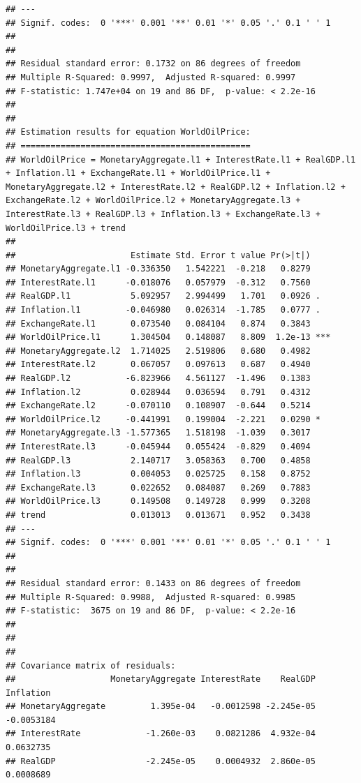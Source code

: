 \documentclass[11pt,preprint, authoryear]{elsarticle}
\numberwithin{equation}{section}
\numberwithin{figure}{section}
\numberwithin{table}{section}
\begin{document}
\begin{verbatim}
## ---
## Signif. codes:  0 '***' 0.001 '**' 0.01 '*' 0.05 '.' 0.1 ' ' 1
## 
## 
## Residual standard error: 0.1732 on 86 degrees of freedom
## Multiple R-Squared: 0.9997,  Adjusted R-squared: 0.9997 
## F-statistic: 1.747e+04 on 19 and 86 DF,  p-value: < 2.2e-16 
## 
## 
## Estimation results for equation WorldOilPrice: 
## ============================================== 
## WorldOilPrice = MonetaryAggregate.l1 + InterestRate.l1 + RealGDP.l1 + Inflation.l1 + ExchangeRate.l1 + WorldOilPrice.l1 + MonetaryAggregate.l2 + InterestRate.l2 + RealGDP.l2 + Inflation.l2 + ExchangeRate.l2 + WorldOilPrice.l2 + MonetaryAggregate.l3 + InterestRate.l3 + RealGDP.l3 + Inflation.l3 + ExchangeRate.l3 + WorldOilPrice.l3 + trend 
## 
##                       Estimate Std. Error t value Pr(>|t|)    
## MonetaryAggregate.l1 -0.336350   1.542221  -0.218   0.8279    
## InterestRate.l1      -0.018076   0.057979  -0.312   0.7560    
## RealGDP.l1            5.092957   2.994499   1.701   0.0926 .  
## Inflation.l1         -0.046980   0.026314  -1.785   0.0777 .  
## ExchangeRate.l1       0.073540   0.084104   0.874   0.3843    
## WorldOilPrice.l1      1.304504   0.148087   8.809  1.2e-13 ***
## MonetaryAggregate.l2  1.714025   2.519806   0.680   0.4982    
## InterestRate.l2       0.067057   0.097613   0.687   0.4940    
## RealGDP.l2           -6.823966   4.561127  -1.496   0.1383    
## Inflation.l2          0.028944   0.036594   0.791   0.4312    
## ExchangeRate.l2      -0.070110   0.108907  -0.644   0.5214    
## WorldOilPrice.l2     -0.441991   0.199004  -2.221   0.0290 *  
## MonetaryAggregate.l3 -1.577365   1.518198  -1.039   0.3017    
## InterestRate.l3      -0.045944   0.055424  -0.829   0.4094    
## RealGDP.l3            2.140717   3.058363   0.700   0.4858    
## Inflation.l3          0.004053   0.025725   0.158   0.8752    
## ExchangeRate.l3       0.022652   0.084087   0.269   0.7883    
## WorldOilPrice.l3      0.149508   0.149728   0.999   0.3208    
## trend                 0.013013   0.013671   0.952   0.3438    
## ---
## Signif. codes:  0 '***' 0.001 '**' 0.01 '*' 0.05 '.' 0.1 ' ' 1
## 
## 
## Residual standard error: 0.1433 on 86 degrees of freedom
## Multiple R-Squared: 0.9988,  Adjusted R-squared: 0.9985 
## F-statistic:  3675 on 19 and 86 DF,  p-value: < 2.2e-16 
## 
## 
## 
## Covariance matrix of residuals:
##                   MonetaryAggregate InterestRate    RealGDP  Inflation
## MonetaryAggregate         1.395e-04   -0.0012598 -2.245e-05 -0.0053184
## InterestRate             -1.260e-03    0.0821286  4.932e-04  0.0632735
## RealGDP                  -2.245e-05    0.0004932  2.860e-05  0.0008689

\end{verbatim}
\end{document}
